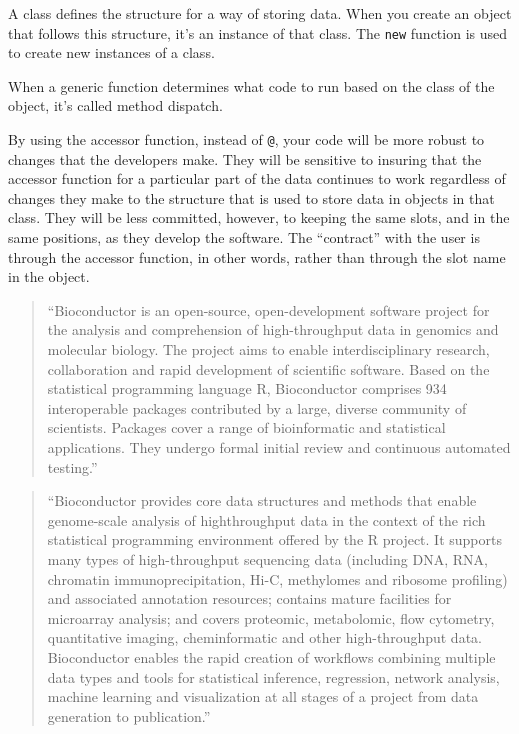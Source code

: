 \documentclass[]{tufte-book}
\begin{document}
A class defines the structure for a way of storing data. When you create
an object that follows this structure, it's an instance of that class.
The \texttt{new} function is used to create new instances of a class.

When a generic function determines what code to run based on the class of the
object, it's called method dispatch.

By using the accessor function, instead of \texttt{@}, your code will be more robust
to changes that the developers make. They will be sensitive to insuring that
the accessor function for a particular part of the data continues to work
regardless of changes they make to the structure that is used to store data in
objects in that class. They will be less committed, however, to keeping the
same slots, and in the same positions, as they develop the software. The
``contract'' with the user is through the accessor function, in other words,
rather than through the slot name in the object.

\begin{quote}
``Bioconductor is an open-source, open-development software project for the
analysis and comprehension of high-throughput data in genomics and molecular
biology. The project aims to enable interdisciplinary research, collaboration
and rapid development of scientific software. Based on the statistical
programming language R, Bioconductor comprises 934 interoperable packages
contributed by a large, diverse community of scientists. Packages cover a range
of bioinformatic and statistical applications. They undergo formal initial
review and continuous automated testing.'' \citep{huber2015orchestrating}
\end{quote}

\begin{quote}
``Bioconductor provides core data structures and methods that enable
genome-scale analysis of highthroughput data in the context of the rich
statistical programming environment offered by the R project. It supports many
types of high-throughput sequencing data (including DNA, RNA, chromatin
immunoprecipitation, Hi-C, methylomes and ribosome profiling) and associated
annotation resources; contains mature facilities for microarray analysis; and
covers proteomic, metabolomic, flow cytometry, quantitative imaging,
cheminformatic and other high-throughput data. Bioconductor enables the rapid
creation of workflows combining multiple data types and tools for statistical
inference, regression, network analysis, machine learning and visualization at
all stages of a project from data generation to publication.''
\citep{huber2015orchestrating}
\end{quote}
\end{document}
